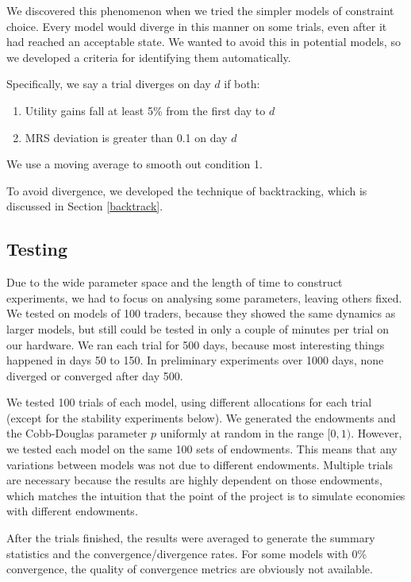 \documentclass[12pt,a4paper,titlepage]{article}
\begin{document}
We discovered this phenomenon when we tried the simpler models of constraint choice.
Every model would diverge in this manner on some trials, even after it had reached an acceptable state.
We wanted to avoid this in potential models, so we developed a criteria for identifying them automatically.

Specifically, we say a trial diverges on day $d$ if both:
\begin{enumerate}
  \item Utility gains fall at least 5\% from the first day to $d$ 
  \item MRS deviation is greater than 0.1 on day $d$
\end{enumerate}
We use a moving average to smooth out condition 1.
    
To avoid divergence, we developed the technique of backtracking, which is discussed in Section \ref{backtrack}.

\subsection{Testing}
Due to the wide parameter space and the length of time to construct experiments, we had to focus on analysing some parameters, leaving others fixed.
We tested on models of 100 traders, because they showed the same dynamics as larger models, but still could be tested in only a couple of minutes per trial on our hardware.
We ran each trial for 500 days, because most interesting things happened in days 50 to 150.
In preliminary experiments over 1000 days, none diverged or converged after day 500.

We tested 100 trials of each model, using different allocations for each trial (except for the stability experiments below).
We generated the endowments and the Cobb-Douglas parameter $p$ uniformly at random in the range $[0, 1)$.
However, we tested each model on the same 100 sets of endowments.
This means that any variations between models was not due to different endowments.
Multiple trials are necessary because the results are highly dependent on those endowments, which matches the intuition that the point of the project is to simulate economies with different endowments.
    
After the trials finished, the results were averaged to generate the summary statistics and the convergence/divergence rates.
For some models with 0\% convergence, the quality of convergence metrics are obviously not available.

\clearpage
\end{document}
